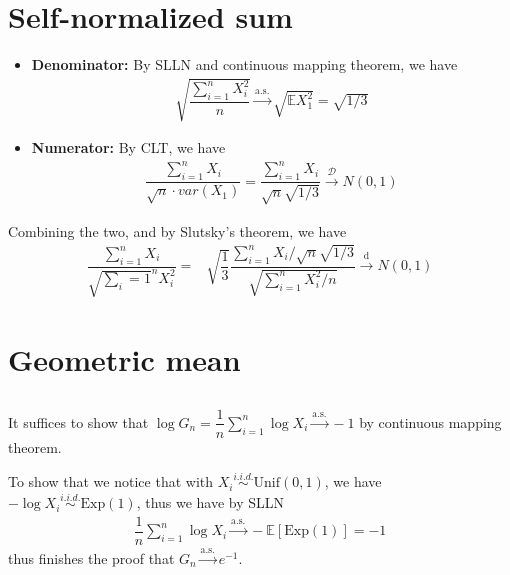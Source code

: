 \documentclass[11pt,a4paper]{article}
\numberwithin{equation}{section}%
\begin{document}
\section{Self-normalized sum}

\begin{itemize}[topsep=2pt,itemsep=0pt]
    \item \textbf{Denominator:} By SLLN and continuous mapping theorem, we have
    \begin{align*}
        \sqrt{\dfrac{ \sum_{i=1}^n X_i^2 }{ n } } \xrightarrow[]{\mathrm{a.s.}} \sqrt{ \mathbb{E} X_1^2 } = \sqrt{1/3}
    \end{align*}
    \item \textbf{Numerator:} By CLT, we have
    \begin{align*}
        \dfrac{ \sum_{i=1}^n X_i }{ \sqrt{n}\cdot var(X_1) } = \dfrac{ \sum_{i=1}^n X_i }{ \sqrt{n}\sqrt{1/3} } \xrightarrow[]{\mathcal{D}} N(0,1)
    \end{align*}
\end{itemize}
Combining the two, and by Slutsky's theorem, we have
\begin{align*}
    \dfrac{ \sum_{i=1}^n X_i }{ \sqrt{\sum_i=1}^n X_i^2 } = & \sqrt{\dfrac{ 1 }{ 3 } }\dfrac{ \sum_{i=1}^n X_i \big/ \sqrt{n}\sqrt{1/3} }{ \sqrt{\sum_{i=1}^n X_i^2 \big/ n } }   \xrightarrow[]{\mathrm{d}} N(0,1)
\end{align*}


\section{Geometric mean}

\subsection{}

It suffices to show that $\log G_n = \dfrac{ 1 }{ n }\sum_{i=1}^n \log X_i \xrightarrow[]{\mathrm{a.s.}} -1   $ by continuous mapping theorem. 

To show that we notice that with $ X_i\mathop{ \sim  }\limits^{i.i.d.} \mathrm{ Unif }(0,1)   $, we have $ -\log X_i \mathop{ \sim }\limits^{i.i.d.}\mathrm{ Exp }(1)   $, thus we have by SLLN
\begin{align*}
    \dfrac{ 1 }{ n }\sum_{i=1}^n \log X_i \xrightarrow[]{\mathrm{a.s.}} -\mathbb{E}\left[ \mathrm{ Exp }(1)  \right] = -1
\end{align*}
thus finishes the proof that $ G_n\xrightarrow[]{\mathrm{a.s.}} e^{-1} $.
\end{document}
